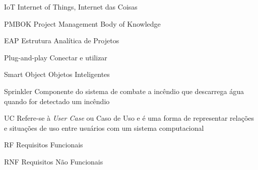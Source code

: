 \begin{siglas}
  \item[IoT] Internet of Things, Internet das Coisas
  \item[PMBOK] Project Management Body of Knowledge
  \item[EAP] Estrutura Analítica de Projetos
  \item[Plug-and-play] Conectar e utilizar
  \item[Smart Object] Objetos Inteligentes
  \item[Sprinkler] Componente do sistema de combate a incêndio que descarrega água quando for detectado um incêndio
  \item[UC] Refere-se à \textit{User Case} ou Caso de Uso e é uma forma de representar relações e situações de uso entre usuários com um sistema computacional
  \item[RF] Requisitos Funcionais
  \item[RNF] Requisitos Não Funcionais
\end{siglas}
